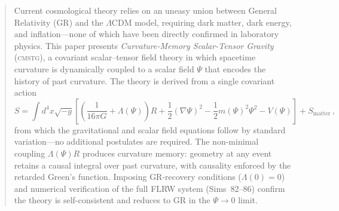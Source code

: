 \documentclass[12pt,a4paper]{article}
\newcommand{\CMSTG}{\textsc{cmstg}}
\begin{document}
\begin{abstract}
Current cosmological theory relies on an uneasy union between General
Relativity (GR) and the $\Lambda$CDM model, requiring dark matter, dark
energy, and inflation---none of which have been directly confirmed in
laboratory physics. This paper presents \emph{Curvature-Memory Scalar-Tensor
Gravity} (\CMSTG), a covariant scalar--tensor field theory in which spacetime
curvature is dynamically coupled to a scalar field $\Psi$ that encodes the
history of past curvature.
The theory is derived from a single covariant action
\begin{equation*}
S = \int d^4x\sqrt{-g}
\left[\left(\frac{1}{16\pi G}+\Lambda(\Psi)\right)R
+ \frac{1}{2}(\nabla\Psi)^2
- \frac{1}{2}m(\Psi)^2\Psi^2 - V(\Psi)\right] + S_{\mathrm{matter}}\,,
\end{equation*}
from which the gravitational and scalar field equations follow by
standard variation---no additional postulates are required. The
non-minimal coupling $\Lambda(\Psi)R$ produces curvature memory: geometry
at any event retains a causal integral over past curvature, with
causality enforced by the retarded Green's function. Imposing GR-recovery
conditions ($\Lambda(0)=0$) and numerical verification of the full FLRW
system (Sims~82--86) confirm the theory is self-consistent and reduces to
GR in the $\Psi\to 0$ limit.


\end{abstract}
\end{document}
